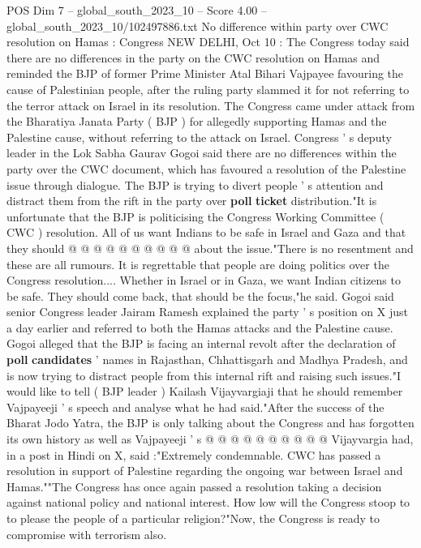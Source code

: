 \begin{textsample}{POS Dim 7 – global\_south\_2023\_10 – Score 4.00 – global\_south\_2023\_10/102497886.txt}  \label{ex:f7_pos_392}
No difference within party over CWC resolution on Hamas : Congress NEW DELHI, Oct 10 : The Congress today said there are no differences in the party on the CWC resolution on Hamas and reminded the BJP of former Prime Minister Atal Bihari Vajpayee favouring the cause of Palestinian people, after the ruling party slammed it for not referring to the terror attack on Israel in its resolution.
The Congress came under attack from the Bharatiya Janata Party ( BJP ) for allegedly supporting Hamas and the Palestine cause, without referring to the attack on Israel.
Congress ' s deputy leader in the Lok Sabha Gaurav Gogoi said there are no differences within the party over the CWC document, which has favoured a resolution of the Palestine issue through dialogue.
The BJP is trying to divert people ' s attention and distract them from the rift in the party over \textbf{poll} \textbf{ticket} distribution."It is unfortunate that the BJP is politicising the Congress Working Committee ( CWC ) resolution.
All of us want Indians to be safe in Israel and Gaza and that they should @ @ @ @ @ @ @ @ @ @ about the issue."There is no resentment and these are all rumours.
It is regrettable that people are doing politics over the Congress resolution....
Whether in Israel or in Gaza, we want Indian citizens to be safe.
They should come back, that should be the focus,"he said.
Gogoi said senior Congress leader Jairam Ramesh explained the party ' s position on X just a day earlier and referred to both the Hamas attacks and the Palestine cause.
Gogoi alleged that the BJP is facing an internal revolt after the declaration of \textbf{poll} \textbf{candidates} ' names in Rajasthan, Chhattisgarh and Madhya Pradesh, and is now trying to distract people from this internal rift and raising such issues."I would like to tell ( BJP leader ) Kailash Vijayvargiaji that he should remember Vajpayeeji ' s speech and analyse what he had said."After the success of the Bharat Jodo Yatra, the BJP is only talking about the Congress and has forgotten its own history as well as Vajpayeeji ' s @ @ @ @ @ @ @ @ @ @ Vijayvargia had, in a post in Hindi on X, said :"Extremely condemnable.
CWC has passed a resolution in support of Palestine regarding the ongoing war between Israel and Hamas.""The Congress has once again passed a resolution taking a decision against national policy and national interest.
How low will the Congress stoop to to please the people of a particular religion?"Now, the Congress is ready to compromise with terrorism also.

\end{textsample}
